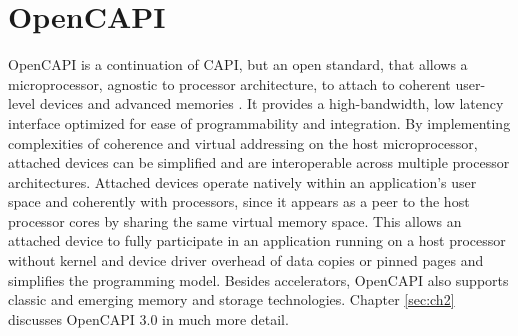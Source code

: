 \section{OpenCAPI}
OpenCAPI is a continuation of CAPI, but an open standard, that allows a microprocessor, agnostic to processor architecture, to attach to coherent user-level devices and advanced memories \cite{stuecheli-power9}. It provides a high-bandwidth, low latency interface optimized for ease of programmability and integration. By implementing complexities of coherence and virtual addressing on the host microprocessor, attached devices can be simplified and are interoperable across multiple processor architectures. Attached devices operate natively within an application’s user space and coherently with processors, since it appears as a peer to the host processor cores by sharing the same virtual memory space. This allows an attached device to fully participate in an application running on a host processor without kernel and device driver overhead of data copies or pinned pages and simplifies the programming model. Besides accelerators, OpenCAPI also supports classic and emerging memory and storage technologies. Chapter \ref{sec:ch2} discusses OpenCAPI 3.0 in much more detail.




